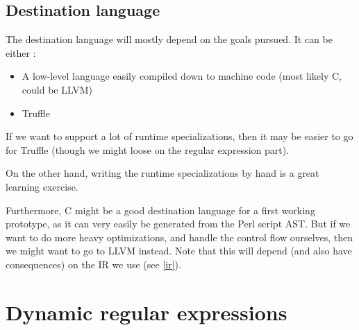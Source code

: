 \documentclass[11pt,a4paper]{report}
\newcommand{\pgl}[1]{\textsf{#1}}
\begin{document}
\subsection{Destination language}

The destination language will mostly depend on the goals pursued. It can be either :
\begin{itemize}
\item A low-level language easily compiled down to machine code (most likely \pgl{C}, could be \pgl{LLVM})
\item Truffle
\end{itemize}

If we want to support a lot of runtime specializations, then it may be easier to go for Truffle (though we might loose on the regular expression part).

On the other hand, writing the runtime specializations by hand is a great learning exercise.

Furthermore, C might be a good destination language for a first working prototype, as it can very easily be generated from the Perl script AST. But if we want to do more heavy optimizations, and handle the control flow ourselves, then we might want to go to LLVM instead. Note that this will depend (and also have consequences) on the IR we use (see \ref{ir}).

\section{Dynamic regular expressions}
\end{document}
